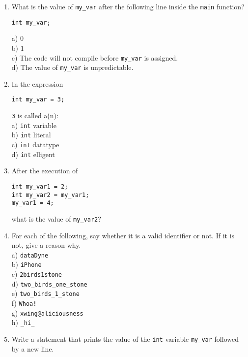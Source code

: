 \documentclass{article}
\begin{document}
\begin{enumerate}
\begin{enumerate}
\end{enumerate}

\item What is the value of \verb|my_var| after the following line inside the \verb|main| function? 

\begin{lstlisting}[style=CStyle]
int my_var;
\end{lstlisting}

a) 0 \\
b) 1 \\
c) The code will not compile before \verb|my_var| is assigned. \\
d) The value of \verb|my_var| is unpredictable.

\item In the expression 

\begin{lstlisting}[style=CStyle]
int my_var = 3;
\end{lstlisting}

\verb|3| is called a(n): \\
a) \verb|int| variable \\
b) \verb|int| literal \\
c) \verb|int| datatype \\
d) \verb|int| elligent

\item After the execution of

\begin{lstlisting}[style=CStyle]
int my_var1 = 2;
int my_var2 = my_var1;
my_var1 = 4;
\end{lstlisting}
what is the value of \verb|my_var2|?

\item For each of the following, say whether it is a valid identifier or not. If it is not, give a reason why. \\
a) \verb|dataDyne| \\
b) \verb|iPhone| \\
c) \verb|2birds1stone| \\
d) \verb|two_birds_one_stone| \\
e) \verb|two_birds_1_stone| \\
f) \verb|Whoa!| \\
g) \verb|xwing@aliciousness| \\
h) \verb|_hi_|

\item Write a statement that prints the value of the \verb|int| variable \verb|my_var| followed by a new line.
\end{enumerate}
\end{document}
